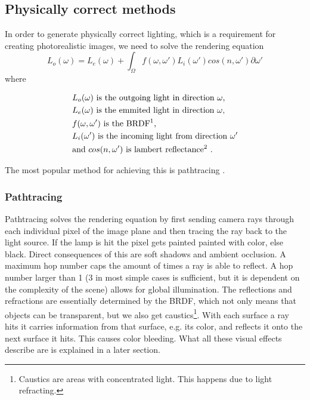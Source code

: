 \documentclass{ACGSeminar}
\begin{document}
	\subsection{Physically correct methods}
	In order to generate physically correct lighting, which is a requirement for creating photorealistic images, we need to solve the rendering equation
	$$ L_o(\omega) = L_e(\omega) + \int_\Omega f(\omega, \omega')L_i(\omega')cos(n, \omega') \partial \omega' $$
	where 
	\begin{center}
		\begin{align*}
			&L_o(\omega) \text{ is the outgoing light in direction } \omega\text{,}\\
			&L_e(\omega) \text{ is the emmited light in direction } \omega\text{,}\\
			&f(\omega, \omega') \text{ is the BRDF\footnotemark} \text{,}\\
			&L_i(\omega') \text{ is the incoming light from direction } \omega'\\
			&\text{and } cos(n, \omega') \text{ is lambert reflectance\footnotemark}  \text{ .}
		\end{align*}
	\end{center}
	\addtocounter{footnote}{-1}
	The most popular method for achieving this is pathtracing \cite{P2PATH}.
	\subsubsection{Pathtracing}
		Pathtracing solves the rendering equation by first sending camera rays through each individual pixel of the image plane and then tracing the ray back to the light source. If the lamp is hit the pixel gets painted painted with color, else black. Direct consequences of this are soft shadows and ambient occlusion. A maximum hop number caps the amount of times a ray is able to reflect. A hop number larger than 1 (3 in most simple cases is sufficient, but it is dependent on the complexity of the scene) allows for global illumination. The reflections and refractions are essentially determined by the BRDF, which not only means that objects can be transparent, but we also get caustics\footnote{Caustics are areas with concentrated light. This happens due to light refracting.}. With each surface a ray hits it carries information from that surface, e.g. its color, and reflects it onto the next surface it hits. This causes color bleeding. What all these visual effects describe are is explained in a later section. %
\end{document}
